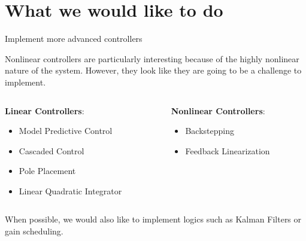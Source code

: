 \section{What we would like to do}

\begin{frame}{Implement more advanced controllers}

    Nonlinear controllers are particularly interesting because of the highly nonlinear nature of the system.
    However, they look like they are going to be a challenge to implement.

    \vspace{9pt}

    \begin{columns}[T, onlytextwidth]

        \begin{column}{0.5\textwidth}

            \textbf{Linear Controllers}:

            \begin{itemize}
                \item Model Predictive Control
                \item Cascaded Control
                \item Pole Placement
                \item Linear Quadratic Integrator
            \end{itemize}

        \end{column}

        \begin{column}{0.5\textwidth}

            \textbf{Nonlinear Controllers}:

            \begin{itemize}
                \item Backstepping
                \item Feedback Linearization
            \end{itemize}

        \end{column}

    \end{columns}

    \vspace{9pt}

    When possible, we would also like to implement logics such as Kalman Filters or gain scheduling.

\end{frame}



